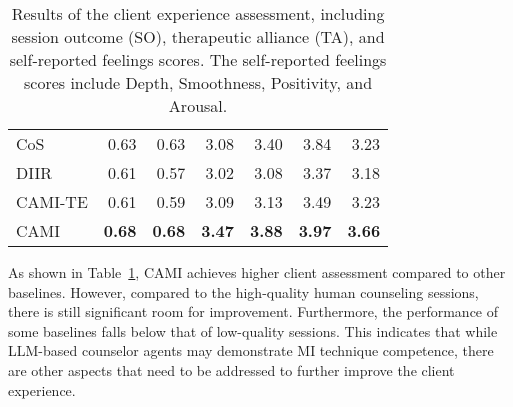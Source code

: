 \begin{table}[tb]
{\begin{tabular}{lrrrrrr}
CoS  & 0.63            & 0.63               & 3.08          & 3.40          & 3.84          & 3.23          \\
DIIR & 0.61            & 0.57               & 3.02          & 3.08          & 3.37          & 3.18          \\
CAMI-TE  & 0.61         & 0.59               & 3.09          & 3.13          & 3.49          & 3.23          \\
CAMI & \textbf{0.68}   & \textbf{0.68}      & \textbf{3.47} & \textbf{3.88} & \textbf{3.97} & \textbf{3.66}          \\ \bottomrule
\end{tabular}}
\caption{Results of the client experience assessment, including session outcome (SO), therapeutic alliance (TA), and self-reported feelings scores. The self-reported feelings scores include Depth, Smoothness, Positivity, and Arousal. }
\label{tab:client assessment}
\end{table}

As shown in Table~\ref{tab:client assessment}, CAMI achieves higher client assessment compared to other baselines. However, compared to the high-quality human counseling sessions, there is still significant room for improvement. Furthermore, the performance of some baselines falls below that of low-quality sessions. This indicates that while LLM-based counselor agents may demonstrate MI technique competence, there are other aspects that need to be addressed to further improve the client experience.

